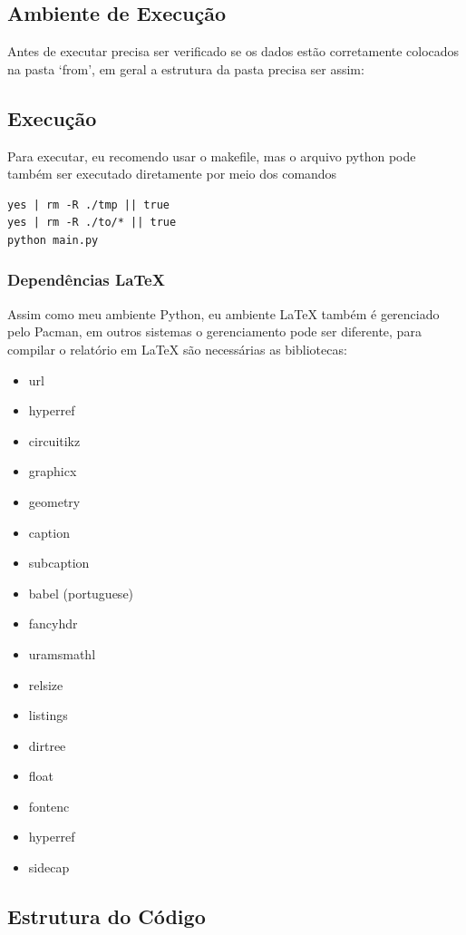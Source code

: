 \documentclass{article}
\begin{document}
\subsection{Ambiente de Execução}
\par Antes de executar precisa ser verificado se os dados estão corretamente colocados na pasta `from',
em geral a estrutura da pasta precisa ser assim:

\subsection{Execução}
\par Para executar, eu recomendo usar o makefile, mas o arquivo python pode também ser
executado diretamente por meio dos comandos
\begin{lstlisting}
yes | rm -R ./tmp || true
yes | rm -R ./to/* || true
python main.py
\end{lstlisting}

\subsubsection{Dependências LaTeX}

\par Assim como meu ambiente Python, eu ambiente LaTeX também é gerenciado pelo Pacman, em outros
sistemas o gerenciamento pode ser diferente, para compilar o relatório em LaTeX são necessárias
as bibliotecas:
\begin{itemize}
\item url
\item hyperref
\item circuitikz
\item graphicx
\item geometry
\item caption
\item subcaption
\item babel (portuguese)
\item fancyhdr
\item uramsmathl
\item relsize
\item listings
\item dirtree
\item float
\item fontenc
\item hyperref
\item sidecap
\end{itemize}

\subsection{Estrutura do Código}
\end{document}
